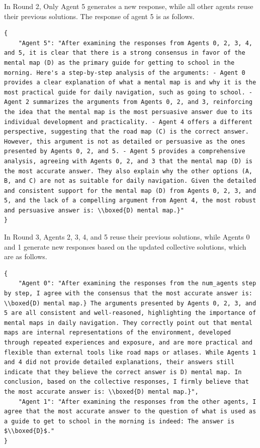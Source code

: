 In Round 2, Only Agent 5 generates a new response, while all other agents reuse their previous solutions. The response of agent 5 is as follows.

\begin{lstlisting}
{
    "Agent 5": "After examining the responses from Agents 0, 2, 3, 4, and 5, it is clear that there is a strong consensus in favor of the mental map (D) as the primary guide for getting to school in the morning. Here's a step-by-step analysis of the arguments: - Agent 0 provides a clear explanation of what a mental map is and why it is the most practical guide for daily navigation, such as going to school. - Agent 2 summarizes the arguments from Agents 0, 2, and 3, reinforcing the idea that the mental map is the most persuasive answer due to its individual development and practicality. - Agent 4 offers a different perspective, suggesting that the road map (C) is the correct answer. However, this argument is not as detailed or persuasive as the ones presented by Agents 0, 2, and 5. - Agent 5 provides a comprehensive analysis, agreeing with Agents 0, 2, and 3 that the mental map (D) is the most accurate answer. They also explain why the other options (A, B, and C) are not as suitable for daily navigation. Given the detailed and consistent support for the mental map (D) from Agents 0, 2, 3, and 5, and the lack of a compelling argument from Agent 4, the most robust and persuasive answer is: \\boxed{D) mental map.}"
}
\end{lstlisting}

In Round 3, Agents 2, 3, 4, and 5 reuse their previous solutions, while Agents 0 and 1 generate new responses based on the updated collective solutions, which are as follows.

\begin{lstlisting}
{
    "Agent 0": "After examining the responses from the num_agents step by step, I agree with the consensus that the most accurate answer is: \\boxed{D) mental map.} The arguments presented by Agents 0, 2, 3, and 5 are all consistent and well-reasoned, highlighting the importance of mental maps in daily navigation. They correctly point out that mental maps are internal representations of the environment, developed through repeated experiences and exposure, and are more practical and flexible than external tools like road maps or atlases. While Agents 1 and 4 did not provide detailed explanations, their answers still indicate that they believe the correct answer is D) mental map. In conclusion, based on the collective responses, I firmly believe that the most accurate answer is: \\boxed{D) mental map.}",
    "Agent 1": "After examining the responses from the other agents, I agree that the most accurate answer to the question of what is used as a guide to get to school in the morning is indeed: The answer is $\\boxed{D}$."
}
\end{lstlisting}

